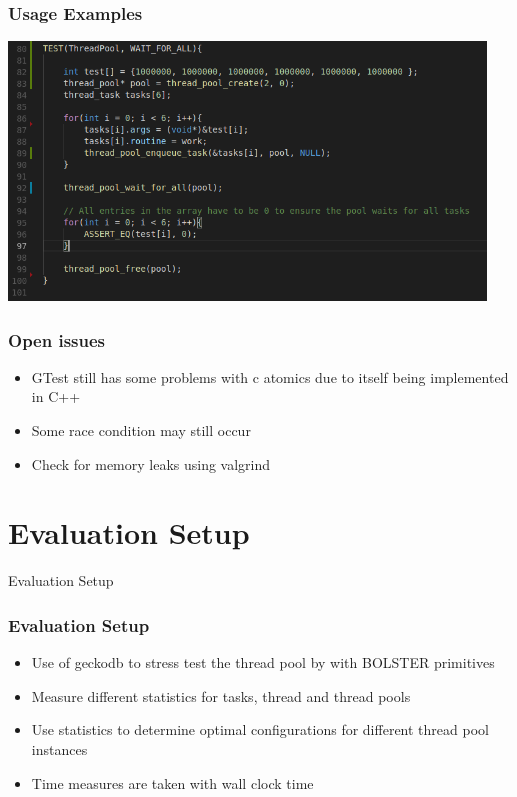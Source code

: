 \documentclass{beamer}
\begin{document}
\begin{frame}
\frametitle{Usage Examples}
\begin{center}
	\includegraphics[width=0.95\textwidth]{img/thread_pool_use2.png}
\end{center}
\end{frame}

\begin{frame}
	\frametitle{Open issues}
	\begin{itemize}
		\item GTest still has some problems with c atomics due to itself being implemented in C++
		\item Some race condition may still occur
		\item Check for memory leaks using valgrind
	\end{itemize}
\end{frame}

\section{Evaluation Setup}
\begin{frame}
	\begin{center}
		\huge Evaluation Setup
	\end{center}
\end{frame}

\begin{frame}
	\frametitle{Evaluation Setup}
	\begin{itemize}
		\item Use of geckodb to stress test the thread pool by with BOLSTER primitives
		\item Measure different statistics for tasks, thread and thread pools
		\item Use statistics to determine optimal configurations for different thread pool instances
		\item Time measures are taken with wall clock time
	\end{itemize}
\end{frame}
\end{document}
